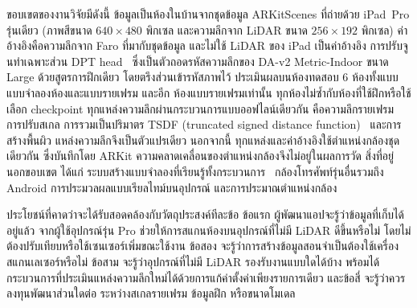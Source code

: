 ขอบเขตของงานวิจัยมีดังนี้ ข้อมูลเป็นห้องในบ้านจากชุดข้อมูล ARKitScenes ที่ถ่ายด้วย iPad~Pro รุ่นเดียว
(ภาพสีขนาด $640\times480$ พิกเซล และความลึกจาก LiDAR ขนาด $256\times192$ พิกเซล)
ค่าอ้างอิงคือความลึกจาก Faro ที่มากับชุดข้อมูล และไม่ใช้ LiDAR ของ iPad เป็นค่าอ้างอิง
การปรับจูนทำเฉพาะส่วน DPT head~\cite{dpt} ซึ่งเป็นตัวถอดรหัสความลึกของ \mbox{DA-v2} Metric-Indoor ขนาด Large
ด้วยสูตรการฝึกเดียว โดยตรึงส่วนเข้ารหัสภาพไว้ ประเมินผลบนห้องทดสอบ 6 ห้องทั้งแบบแบบจำลองห้องและแบบรายเฟรม
และอีก \rsVN{} ห้องแบบรายเฟรมเท่านั้น ทุกห้องไม่ซ้ำกับห้องที่ใช้ฝึกหรือใช้เลือก checkpoint
ทุกแหล่งความลึกผ่านกระบวนการแบบออฟไลน์เดียวกัน คือความลึกรายเฟรม การปรับสเกล
การรวมเป็นปริมาตร TSDF (truncated signed distance function)~\cite{curless96} และการสร้างพื้นผิว
แหล่งความลึกจึงเป็นตัวแปรเดียว นอกจากนี้ ทุกแหล่งและค่าอ้างอิงใช้ตำแหน่งกล้องชุดเดียวกัน
ซึ่งบันทึกโดย ARKit ความคลาดเคลื่อนของตำแหน่งกล้องจึงไม่อยู่ในผลการวัด สิ่งที่อยู่นอกขอบเขต ได้แก่
ระบบสร้างแบบจำลองที่เรียนรู้ทั้งกระบวนการ~\cite{atlas,neuralrecon,simplerecon}
กล้องโทรศัพท์รุ่นอื่นรวมถึง Android การประมวลผลแบบเรียลไทม์บนอุปกรณ์ และการประมาณตำแหน่งกล้อง

ประโยชน์ที่คาดว่าจะได้รับสอดคล้องกับวัตถุประสงค์ทีละข้อ ข้อแรก ผู้พัฒนาแอปจะรู้ว่าข้อมูลที่เก็บได้อยู่แล้ว
จากผู้ใช้อุปกรณ์รุ่น Pro ช่วยให้การสแกนห้องบนอุปกรณ์ที่ไม่มี LiDAR ดีขึ้นหรือไม่
โดยไม่ต้องปรับเทียบหรือใช้เซนเซอร์เพิ่มขณะใช้งาน ข้อสอง จะรู้ว่าการสร้างข้อมูลสอนจำเป็นต้องใช้เครื่องสแกนเลเซอร์หรือไม่
ข้อสาม จะรู้ว่าอุปกรณ์ที่ไม่มี LiDAR รองรับงานแบบใดได้บ้าง
พร้อมได้กระบวนการที่ประเมินแหล่งความลึกใหม่ได้ด้วยการแก้ค่าตั้งค่าเพียงรายการเดียว
และข้อสี่ จะรู้ว่าควรลงทุนพัฒนาส่วนใดต่อ ระหว่างสเกลรายเฟรม ข้อมูลฝึก หรือขนาดโมเดล
